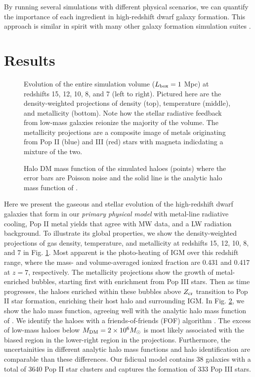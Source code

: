 \documentclass[useAMS,usenatbib]{mn2e}
\begin{document}
By running several simulations with different physical scenarios, we
can quantify the importance of each ingredient in high-redshift dwarf
galaxy formation.  This approach is similar in spirit with many other
galaxy formation simulation suites \citep[e.g.][]{Schaye10,
  Maio10_Pop32}.

\section{Results}
\label{sec:results}

\begin{figure*}
  \caption{\label{fig:evo-mosaic} Evolution of the entire simulation
    volume ($L_{\rm box} = 1$ Mpc) at redshifts 15, 12, 10, 8, and 7
    (left to right).  Pictured here are the density-weighted
    projections of density (top), temperature (middle), and
    metallicity (bottom).  Note how the stellar radiative feedback
    from low-mass galaxies reionize the majority of the volume.  The
    metallicity projections are a composite image of metals
    originating from Pop II (blue) and III (red) stars with magneta
    indicdating a mixture of the two.}
\end{figure*}

\begin{figure}
  \caption{\label{fig:mass_fn} Halo DM mass function of the simulated
    haloes (points) where the error bars are Poisson noise and the
    solid line is the analytic halo mass function of
    \citet{Warren06}.}
\end{figure}



Here we present the gaseous and stellar evolution of the high-redshift
dwarf galaxies that form in our \textit{primary physical model} with
metal-line radiative cooling, Pop II metal yields that agree with MW
data, and a LW radiation background.  To illustrate its global
properties, we show the density-weighted projections of gas density,
temperature, and metallicity at redshifts 15, 12, 10, 8, and 7 in
Fig. \ref{fig:evo-mosaic}.  Most apparent is the photo-heating of IGM
over this redshift range, where the mass- and volume-averaged ionized
fraction are 0.431 and 0.417 at $z=7$, respectively.  The metallicity
projections show the growth of metal-enriched bubbles, starting first
with enrichment from Pop III stars.  Then as time progresses, the
haloes enriched within these bubbles above $Z_{\rm cr}$ transition to
Pop II star formation, enriching their host halo and surrounding IGM.
In Fig. \ref{fig:mass_fn}, we show the halo mass function, agreeing
well with the analytic halo mass function of \citet{Warren06}.  We
identify the haloes with a friends-of-friends (FOF) algorithm
\citep{Davis85}.  The excess of low-mass haloes below $M_{\rm DM} = 2
\times 10^6 \Ms$ is most likely associated with the biased region in
the lower-right region in the projections.  Furthermore, the
uncertainities in different analytic halo mass functions
\citep[see][for a comparison]{Reed07} and halo identification are
comparable than these differences.  Our fidicual model contains 38
galaxies with a total of 3640 Pop II star clusters and captures the
formation of 333 Pop III stars.
\end{document}
